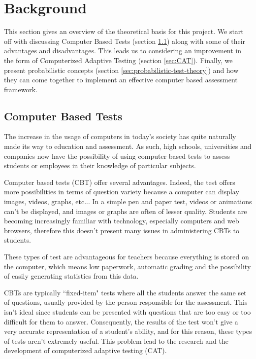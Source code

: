 \chapter{Background}
\label{chap:background}
This section gives an overview of the theoretical basis for this project. We start off with discussing Computer Based Tests (section \ref{sec:CBT}) along with some of their advantages and disadvantages. This leads us to considering an improvement in the form of Computerized Adaptive Testing (section \ref{sec:CAT}). Finally, we present probabilistic concepts (section \ref{sec:probabilistic-test-theory}) and how they can come together to implement an effective computer based assessment framework.

\section{Computer Based Tests}
\label{sec:CBT}
The increase in the usage of computers in today's society has quite naturally made its way to education and assessment. As such, high schools, universities and companies now have the possibility of using computer based tests to assess students or employees in their knowledge of particular subjects.\newline

Computer based tests (CBT) offer several advantages. Indeed, the test offers more possibilities in terms of question variety because a computer can display images, videos, graphs, etc... In a simple pen and paper test, videos or animations can't be displayed, and images or graphs are often of lesser quality. Students are becoming increasingly familiar with technology, especially computers and web browsers, therefore this doesn't present many issues in administering CBTs to students. \newline

These types of test are advantageous for teachers because everything is stored on the computer, which means low paperwork, automatic grading and the possibility of easily generating statistics from this data.\newline

CBTs are typically ``fixed-item" tests where all the students answer the same set of questions, usually provided by the person responsible for the assessment. This isn't ideal since students can be presented with questions that are too easy or too difficult for them to answer. Consequently, the results of the test won't give a very accurate representation of a student's ability, and for this reason, these types of tests aren't extremely useful. This problem lead to the research and the development of computerized adaptive testing (CAT).

